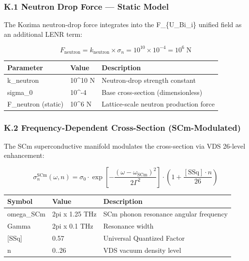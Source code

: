 \documentclass[
  11pt,
]{article}
\newcounter{none} %
\begin{document}
\subsubsection{K.1 Neutron Drop Force --- Static
Model}\label{k.1-neutron-drop-force-static-model}

The Kozima neutron-drop force integrates into the F\_\{U\_Bi\_i\}
unified field as an additional LENR term:

\[F_{\mathrm{neutron}} = k_{\mathrm{neutron}} \times \sigma_n = 10^{10} \times 10^{-4} = 10^6 \;\text{N}\]

{\def\LTcaptype{none} %
\begin{longtable}[]{@{}lll@{}}
\toprule\noalign{}
Parameter & Value & Description \\
\midrule\noalign{}
\endhead
\bottomrule\noalign{}
\endlastfoot
k\_neutron & 10\^{}10 N & Neutron-drop strength constant \\
sigma\_0 & 10\^{}-4 & Base cross-section (dimensionless) \\
F\_neutron (static) & 10\^{}6 N & Lattice-scale neutron production
force \\
\end{longtable}
}

\subsubsection{K.2 Frequency-Dependent Cross-Section
(SCm-Modulated)}\label{k.2-frequency-dependent-cross-section-scm-modulated}

The SCm superconductive manifold modulates the cross-section via VDS
26-level enhancement:

\[\sigma_n^{\mathrm{SCm}}(\omega, n) = \sigma_0 \cdot \exp\!\left[-\frac{(\omega - \omega_{\mathrm{SCm}})^2}{2\Gamma^2}\right] \cdot \left(1 + \frac{[\text{SSq}] \cdot n}{26}\right)\]

{\def\LTcaptype{none} %
\begin{longtable}[]{@{}lll@{}}
\toprule\noalign{}
Symbol & Value & Description \\
\midrule\noalign{}
\endhead
\bottomrule\noalign{}
\endlastfoot
omega\_SCm & 2pi x 1.25 THz & SCm phonon resonance angular frequency \\
Gamma & 2pi x 0.1 THz & Resonance width \\
{[}SSq{]} & 0.57 & Universal Quantized Factor \\
n & 0..26 & VDS vacuum density level \\
\end{longtable}
}
\end{document}
